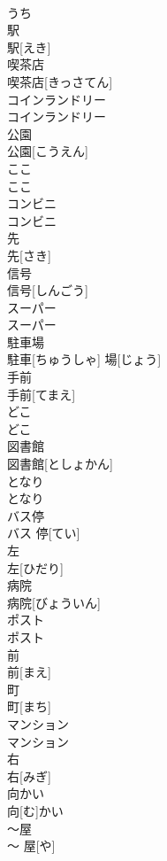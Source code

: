 \documentclass[8pt]{extreport}
\begin{document}
\begin{CJK}{UTF8}{min}
\\	うち		
\\	駅	
\\	駅[えき]		
\\	喫茶店	
\\	喫茶店[きっさてん]		
\\	コインランドリー	
\\	コインランドリー		
\\	公園	
\\	公園[こうえん]		
\\	ここ	
\\	ここ		
\\	コンビニ	
\\	コンビニ		
\\	先	
\\	先[さき]		
\\	信号	
\\	信号[しんごう]		
\\	スーパー	
\\	スーパー		
\\	駐車場	
\\	駐車[ちゅうしゃ] 場[じょう]		
\\	手前	
\\	手前[てまえ]		
\\	どこ	
\\	どこ		
\\	図書館	
\\	図書館[としょかん]		
\\	となり	
\\	となり		
\\	バス停	
\\	バス 停[てい]		
\\	左	
\\	左[ひだり]		
\\	病院	
\\	病院[びょういん]		
\\	ポスト	
\\	ポスト		
\\	前	
\\	前[まえ]		
\\	町	
\\	町[まち]		
\\	マンション	
\\	マンション		
\\	右	
\\	右[みぎ]		
\\	向かい	
\\	向[む]かい		
\\	〜屋	
\\	〜 屋[や]		

\end{CJK}
\end{document}

